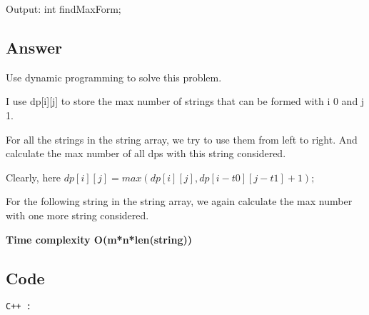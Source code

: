 Output: int findMaxForm;

\subsection{Answer}
Use dynamic programming to solve this problem.

I use dp[i][j] to store the max number of strings that can be formed with i 0 and j 1.

For all the strings in the string array, we try to use them from left to right. And calculate the max number of all dps with this string considered. 

Clearly, here $dp [ i ][ j ] = max ( dp [ i ][ j ] , dp [i - t0 ][ j - t1 ]+1) ;$

For the following string in the string array, we again calculate the max number with one more string considered.

\textbf{\color{red}Time complexity O(m*n*len(string))}
\newpage
\subsection{Code}
\texttt{C++ :}


